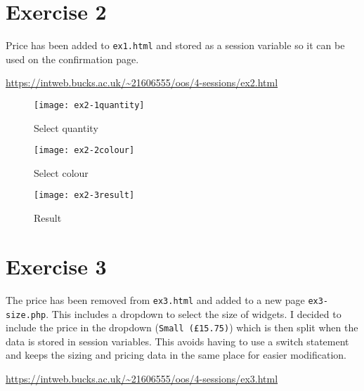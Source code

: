 \section{Exercise 2}

Price has been added to \texttt{ex1.html} and stored as a session variable so it can be used on the confirmation page.

\url{https://intweb.bucks.ac.uk/~21606555/oos/4-sessions/ex2.html}

\captionsetup{type=figure}


\clearpage
\captionsetup{type=figure}


\captionsetup{type=figure}


\begin{figure}[H]
  \caption{Select quantity}
  \centering
  \texttt{[image: ex2-1quantity]}
\end{figure}

\begin{figure}[H]
  \caption{Select colour}
  \centering
  \texttt{[image: ex2-2colour]}
\end{figure}

\begin{figure}[H]
  \caption{Result}
  \centering
  \texttt{[image: ex2-3result]}
\end{figure}

\clearpage
\section{Exercise 3}

The price has been removed from \texttt{ex3.html} and added to a new page \texttt{ex3-size.php}. This includes a dropdown to select the size of widgets. I decided to include the price in the dropdown (\texttt{Small (£15.75)}) which is then split when the data is stored in session variables. This avoids having to use a switch statement and keeps the sizing and pricing data in the same place for easier modification.

\url{https://intweb.bucks.ac.uk/~21606555/oos/4-sessions/ex3.html}

\captionsetup{type=figure}


